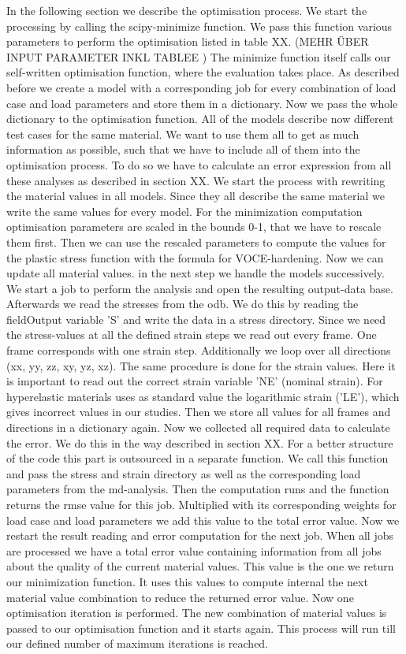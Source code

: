 In the following section we describe the optimisation process. We start the processing by calling the scipy-minimize function. We pass this function various parameters to perform the optimisation listed in table XX. (MEHR ÜBER INPUT PARAMETER INKL TABLEE ) The minimize function itself calls our self-written optimisation function, where the evaluation takes place. As described before we create a model with a corresponding job for every combination of load case and load parameters and store them in a dictionary. Now we pass the whole dictionary to the optimisation function. All of the models describe now different test cases for the same material. We want to use them all to get as much information as possible, such that we have to include all of them into the optimisation process. To do so we have to calculate an error expression from all these analyses as described in section XX. 
We start the process with rewriting the material values in all models. Since they all describe the same material we write the same values for every model. For the minimization computation optimisation parameters are scaled in the bounds 0-1, that we have to rescale them first. Then we can use the rescaled parameters to compute the values for the plastic stress function with the formula for VOCE-hardening. Now we can update all material values. in the next step we handle the models successively. We start a job to perform the  analysis and open the resulting output-data base. Afterwards we read the stresses from the odb. We do this by reading the fieldOutput variable 'S' and write the data in a stress directory. Since we need the stress-values at all the defined strain steps we read out every frame. One frame corresponds with one strain step. Additionally we loop over all directions (xx, yy, zz, xy, yz, xz). The same procedure is done for the strain values. Here it is important to read out the correct strain variable 'NE' (nominal strain). For hyperelastic materials  uses as standard value the logarithmic strain ('LE'), which gives incorrect values in our studies. Then we store all values for all frames and directions in a dictionary again. Now we collected all required data to calculate the error. We do this in the way described in section XX. For a better structure of the code this part is outsourced in a separate function. We call this function and pass the stress and strain directory as well as the corresponding load parameters from the md-analysis. Then the computation runs and the function returns the rmse value for this job. Multiplied with its corresponding weights for load case and load parameters we add this value to the total error value. Now we restart the result reading and error computation for the next job. When all jobs are processed we have a total error value containing information from all jobs about the quality of the current material values. This value is the one we return our minimization function. It uses this values to compute internal the next material value combination to reduce the returned error value. Now one optimisation iteration is performed. The new combination of material values is passed to our optimisation function and it starts again. This process will run till our defined number of maximum iterations is reached. 

